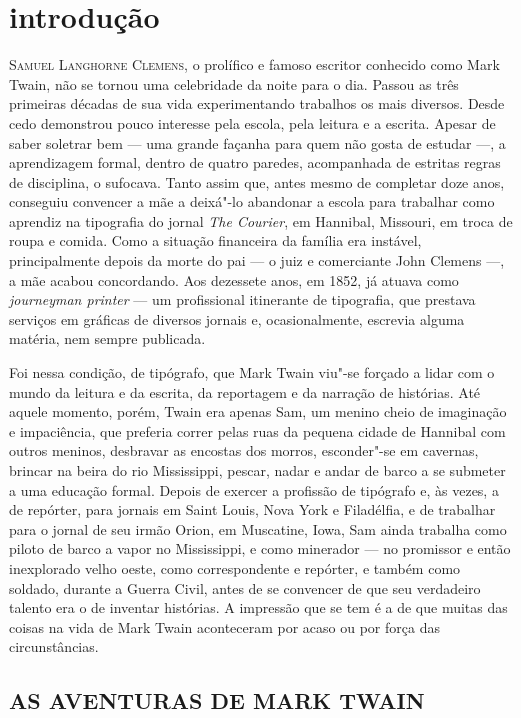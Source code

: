 \chapter[Introdução, por Hanna Betina Gotz]{introdução}


\textsc{Samuel Langhorne Clemens,} o prolífico e famoso escritor conhecido como Mark
Twain, não se tornou uma celebridade da noite para o dia. Passou as três
primeiras décadas de sua vida experimentando trabalhos os mais diversos.
Desde cedo demonstrou pouco interesse pela escola,
pela leitura e a escrita. Apesar de saber soletrar bem --- uma grande
façanha para quem não gosta de estudar ---, a aprendizagem formal, dentro de
quatro paredes, acompanhada de estritas regras de disciplina, o sufocava. Tanto assim que, antes mesmo de
completar doze anos, conseguiu convencer a mãe a deixá"-lo abandonar 
a escola para trabalhar como aprendiz na tipografia do jornal \textit{The Courier},
em Hannibal, Missouri, em troca de roupa e comida. Como a situação
financeira da família era instável, principalmente depois da morte do pai
--- o juiz e comerciante John Clemens ---, a mãe acabou concordando. Aos dezessete
anos, em 1852, já atuava como \textit{journeyman printer} --- um
profissional itinerante de tipografia, que prestava serviços em gráficas
de diversos jornais e, ocasionalmente, escrevia alguma matéria, nem
sempre publicada.

Foi nessa condição, de tipógrafo, que Mark Twain
viu"-se forçado a lidar com o mundo da leitura e da escrita, da reportagem
e da narração de histórias. Até aquele momento, porém, Twain era
apenas Sam, um menino cheio de imaginação e impaciência, que preferia
correr pelas ruas da pequena cidade de Hannibal com outros meninos,
desbravar as encostas dos morros, esconder"-se em cavernas, brincar na
beira do rio Mississippi, pescar, nadar e andar de barco a se submeter a
uma educação formal. Depois de exercer a profissão de tipógrafo e, às
vezes, a de repórter, para jornais em Saint Louis, Nova York e
Filadélfia, e de trabalhar para o jornal de seu irmão Orion, em
Muscatine, Iowa, Sam ainda trabalha como piloto de barco a vapor no
Mississippi, e como minerador --- no promissor e então inexplorado velho oeste,
como correspondente e repórter, e também como soldado, durante a Guerra
Civil, antes de se convencer de que seu verdadeiro talento era o de inventar
histórias. A impressão que se tem é a de que muitas das coisas na vida de
Mark Twain aconteceram por acaso ou por força das circunstâncias.

\section{AS AVENTURAS DE MARK TWAIN}

